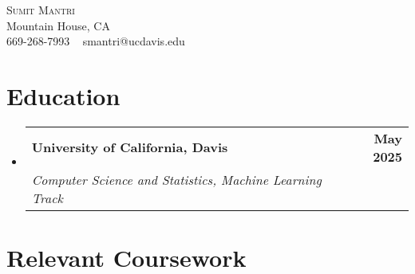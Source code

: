 \documentclass[letterpaper,11pt]{article}
\makeatletter
\newcommand{\resumeSubheading}[4]{
  \vspace{-2pt}\item
  \begin{tabular*}{1.0\textwidth}[t]{l@{\extracolsep{\fill}}r}
    \textbf{#1} & \textbf{\small #2} \\
    \textit{\small#3} & \textit{\small #4} \\
  \end{tabular*}\vspace{-7pt}
}
\newcommand{\resumeSubHeadingListStart}{\begin{itemize}[leftmargin=0.0in, label={}]}
\newcommand{\resumeSubHeadingListEnd}{\end{itemize}}
\makeatother
\begin{document}
\begin{center}
    {\Huge \scshape Sumit Mantri} \\[1pt]
    Mountain House, CA \\[1pt]
    \small 669-268-7993 ~ smantri@ucdavis.edu
\end{center}

\section{Education}
\resumeSubHeadingListStart
  \resumeSubheading
    {University of California, Davis}{May 2025}
    {Computer Science and Statistics, Machine Learning Track}{}
\resumeSubHeadingListEnd

\section{Relevant Coursework}
\begin{multicols}{4}
    \begin{itemize}[itemsep=-5pt, parsep=3pt]
    \end{itemize}
\end{multicols}

\end{document}
